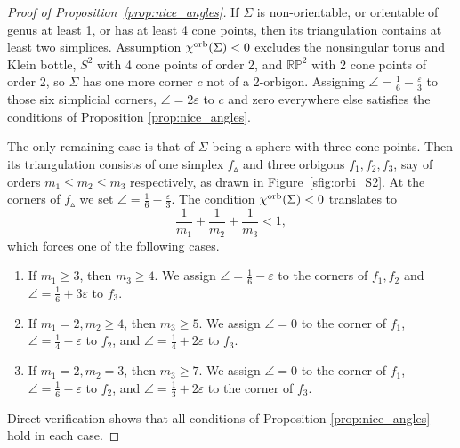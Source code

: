 \documentclass{amsart}
\newcommand{\cho}{\chi^{\textnormal{orb}}}
\begin{document}
\begin{proof}[Proof of Proposition~\ref{prop:nice_angles}]
If $\Sigma$ is non-orientable, or orientable of genus at least 1, or has at least 4 cone points, then its triangulation contains at least two simplices. Assumption $\cho(\Sigma)<0$ excludes the nonsingular torus and Klein bottle, $S^2$ with 4 cone points of order 2, and $\mathbb{RP}^2$ with 2 cone points of order 2, so $\Sigma$ has one more corner $c$ not of a 2-orbigon. Assigning $\angle=\tfrac{1}{6}-\tfrac{\varepsilon}{3}$ to those six simplicial corners, $\angle=2\varepsilon$ to $c$ and zero everywhere else satisfies the conditions of Proposition \ref{prop:nice_angles}.

The only remaining case is that of $\Sigma$ being a sphere with three cone points. Then its triangulation consists of one simplex $f_\vartriangle$ and three orbigons $f_1,f_2,f_3$, say of orders $m_1\leqslant m_2\leqslant m_3$ respectively, as drawn in Figure~\ref{sfig:orbi_S2}. At the corners of $f_\vartriangle$ we set $\angle=\tfrac{1}{6}-\tfrac{\varepsilon}{3}$. The condition $\cho(\Sigma)<0$ translates to
\begin{equation*}
\frac{1}{m_1}+\frac{1}{m_2}+\frac{1}{m_3}<1,
\end{equation*}
which forces one of the following cases.
\begin{enumerate}
\item If $m_1\geqslant3$, then $m_3\geqslant4$. We assign $\angle=\tfrac{1}{6}-\varepsilon$ to the corners of $f_1,f_2$ and $\angle=\tfrac{1}{6}+3\varepsilon$ to $f_3$.
\item If $m_1=2,m_2\geqslant4$, then $m_3\geqslant5$. We assign $\angle=0$ to the corner of $f_1$, $\angle=\tfrac{1}{4}-\varepsilon$ to $f_2$, and $\angle=\tfrac{1}{4}+2\varepsilon$ to $f_3$.
\item If $m_1=2,m_2=3$, then $m_3\geqslant7$. We assign $\angle=0$ to the corner of $f_1$, $\angle=\tfrac{1}{6}-\varepsilon$ to $f_2$, and $\angle=\tfrac{1}{3}+2\varepsilon$ to the corner of $f_3$.
\end{enumerate}
Direct verification shows that all conditions of Proposition \ref{prop:nice_angles} hold in each case.
\end{proof}
\end{document}
